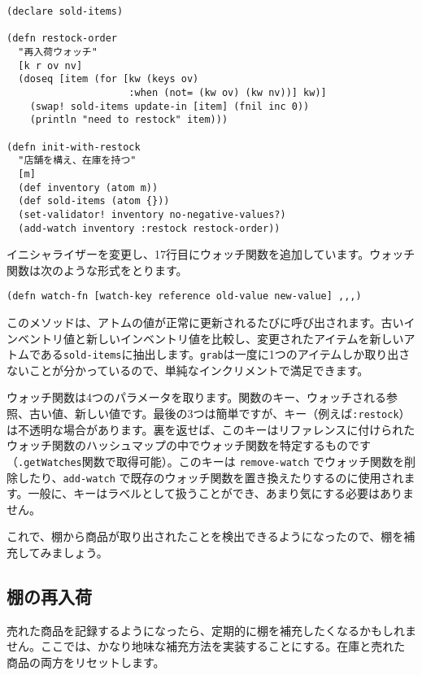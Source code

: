 \begin{lstlisting}[]
(declare sold-items)

(defn restock-order
  "再入荷ウォッチ"
  [k r ov nv]
  (doseq [item (for [kw (keys ov)
                     :when (not= (kw ov) (kw nv))] kw)]
    (swap! sold-items update-in [item] (fnil inc 0))
    (println "need to restock" item)))

(defn init-with-restock
  "店舗を構え、在庫を持つ"
  [m]
  (def inventory (atom m))
  (def sold-items (atom {}))
  (set-validator! inventory no-negative-values?)
  (add-watch inventory :restock restock-order))
\end{lstlisting}

イニシャライザーを変更し、17行目にウォッチ関数を追加しています。ウォッチ関数は次のような形式をとります。

\begin{lstlisting}[numbers=none]
(defn watch-fn [watch-key reference old-value new-value] ,,,)
\end{lstlisting}

このメソッドは、アトムの値が正常に更新されるたびに呼び出されます。古いインベントリ値と新しいインベントリ値を比較し、変更されたアイテムを新しいアトムである\texttt{sold-items}に抽出します。\texttt{grab}は一度に1つのアイテムしか取り出さないことが分かっているので、単純なインクリメントで満足できます。

ウォッチ関数は4つのパラメータを取ります。関数のキー、ウォッチされる参照、古い値、新しい値です。最後の3つは簡単ですが、キー（例えば\texttt{:restock}）は不透明な場合があります。裏を返せば、このキーはリファレンスに付けられたウォッチ関数のハッシュマップの中でウォッチ関数を特定するものです（\texttt{.getWatches}関数で取得可能）。このキーは \texttt{remove-watch} でウォッチ関数を削除したり、\texttt{add-watch} で既存のウォッチ関数を置き換えたりするのに使用されます。一般に、キーはラベルとして扱うことができ、あまり気にする必要はありません。

これで、棚から商品が取り出されたことを検出できるようになったので、棚を補充してみましょう。

\subsection{棚の再入荷}

売れた商品を記録するようになったら、定期的に棚を補充したくなるかもしれません。ここでは、かなり地味な補充方法を実装することにする。在庫と売れた商品の両方をリセットします。



